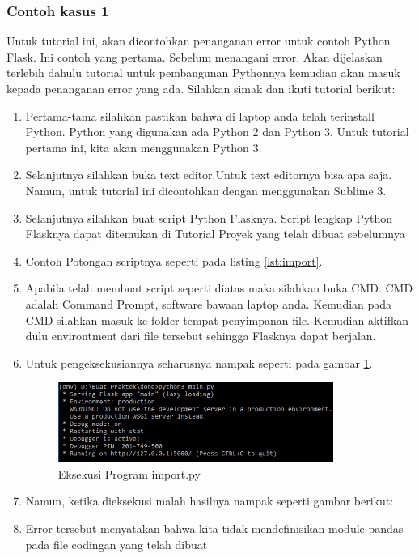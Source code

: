 \subsubsection{Contoh kasus 1}
Untuk tutorial ini, akan dicontohkan penanganan error untuk contoh Python Flask. Ini contoh yang pertama. Sebelum menangani error. Akan dijelaskan terlebih dahulu tutorial untuk pembangunan Pythonnya kemudian akan masuk kepada penanganan error yang ada. Silahkan simak dan ikuti tutorial berikut:
\begin{enumerate}
\item Pertama-tama silahkan pastikan bahwa di laptop anda telah terinstall Python. Python yang digunakan ada Python 2 dan Python 3. Untuk tutorial pertama ini, kita akan menggunakan Python 3.
\item Selanjutnya silahkan buka text editor.Untuk text editornya bisa apa saja. Namun, untuk tutorial ini dicontohkan dengan menggunakan Sublime 3.
\item Selanjutnya silahkan buat script Python Flasknya. Script lengkap Python Flasknya dapat ditemukan di Tutorial Proyek yang telah dibuat sebelumnya 
\item Contoh Potongan scriptnya seperti pada listing \ref{lst:import}.

\item Apabila telah membuat script seperti diatas maka silahkan buka CMD. CMD adalah Command Prompt, software bawaan laptop anda. Kemudian pada CMD silahkan masuk ke folder tempat penyimpanan file. Kemudian aktifkan dulu environtment dari file tersebut sehingga Flasknya dapat berjalan.
\item Untuk pengeksekusiannya seharusnya nampak seperti pada gambar \ref{fig:eksekusi_fungsi12}.
\begin{figure}[!htbp]
	\centerline{\includegraphics[width=0.85\textwidth]{figures/8/eksekusi_fungsi12.png}}
	\caption{Eksekusi Program import.py}
	\label{fig:eksekusi_fungsi12}
\end{figure}
\item Namun, ketika dieksekusi malah hasilnya nampak seperti gambar berikut:
\item Error tersebut menyatakan bahwa kita tidak mendefinisikan module pandas pada file codingan yang telah dibuat

\end{enumerate}
